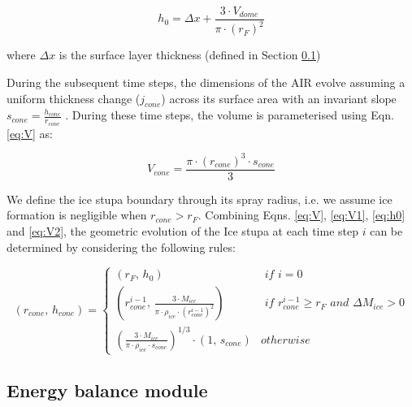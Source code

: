 \begin{equation}
	h_{0} =  \Delta x + \frac{3 \cdot V_{dome}}{\pi \cdot (r_F)^2 }
	\label{eq:h0}
\end{equation}

where $\Delta x$ is the surface layer thickness (defined in Section \ref{sec:energy})

During the subsequent time steps, the dimensions of the AIR evolve assuming a uniform thickness change ($j_{cone}$)
across its surface area with an invariant slope $s_{cone} = \frac{h_{cone}}{r_{cone}}$ .  During these time
steps, the volume is parameterised using Eqn. \ref{eq:V} as:

\begin{equation} 
  V_{cone} = \frac{\pi \cdot {(r_{cone})}^3 \cdot s_{cone}}{3} 
\label{eq:V2} 
\end{equation}

We define the ice stupa boundary through its spray radius, i.e. we assume ice formation is negligible when $r_{cone} >
	r_{F}$. Combining Eqns. \ref{eq:V},  \ref{eq:V1}, \ref{eq:h0} and \ref{eq:V2}, the geometric evolution of the
Ice stupa at each time step $i$ can be determined by considering the following rules:

\begin{equation} (r_{cone},\, h_{cone}) = \left\{ \begin{array}{ll} (r_F ,\, h_0)                                                                          & \textit{ if } i=0 \\
             (r_{cone}^{i-1},\, \frac{3 \cdot M_{ice}}{\pi \cdot \rho_{ice} \cdot {(r_{cone}^{i-1})}^2}) & \textit{ if }
             r_{cone}^{i-1} \geq r_{F} \textit{ and } \Delta M_{ice} > 0                                                     \\ (\frac{3 \cdot M_{ice}}{\pi \cdot \rho_{ice} \cdot s_{cone}})^{1/3} \cdot (1,\,  s_{cone}) &
             otherwise\end{array} \right.  \label{eq:A2} \end{equation}

\subsection{Energy balance module} \label{sec:energy}

